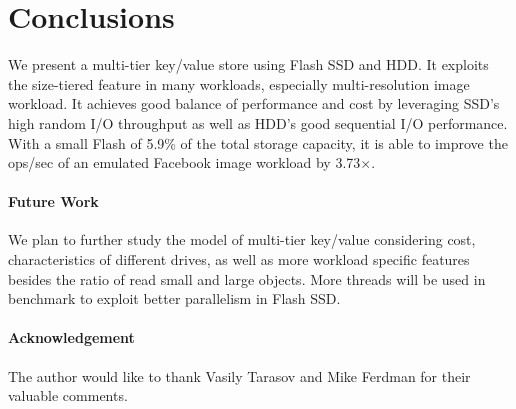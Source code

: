 \section{Conclusions}
\label{sec:conc}
We present a multi-tier key/value store using Flash SSD and HDD. It
exploits the size-tiered feature in many workloads, especially
multi-resolution image workload. It achieves good balance of
performance and cost by leveraging SSD's high random I/O throughput as
well as HDD's good sequential I/O performance. With a small Flash of
5.9\% of the total storage capacity, it is able to improve the ops/sec
of an emulated Facebook image workload by 3.73$\times$.

\paragraph{Future Work}
We plan to further study the model of multi-tier key/value considering
cost, characteristics of different drives, as well as more workload
specific features besides the ratio of read small and large objects.
More threads will be used in benchmark to exploit better parallelism
in Flash SSD.

\paragraph{Acknowledgement}
The author would like to thank Vasily Tarasov and Mike Ferdman for
their valuable comments.

